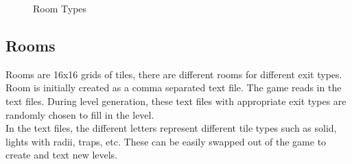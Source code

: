 \documentclass[11pt]{article}
\begin{document}
\begin{figure}[!htb]
\begin {minipage}{0.49\textwidth}
     \caption{Room Types}\label{Fig:Data2}
   \end{minipage}
\end{figure}

\subsection{Rooms}
Rooms are 16x16 grids of tiles, there are different rooms for different exit types. Room is initially created as a comma separated text file. The game reads in the text files. During level generation, these text files with appropriate exit types are randomly chosen to fill in the level.\\

In the text files, the different letters represent different tile types such as solid, lights with radii, traps, etc. These can be easily swapped out of the game to create and text new levels.
\end{document}
